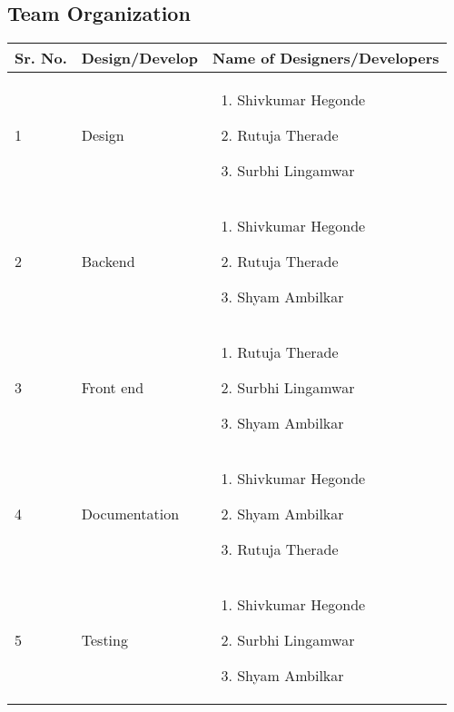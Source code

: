 \documentclass[10pt,a4paper]
{article}
\numberwithin{table}{section}
\begin{document}
{{\begin{normalsize}
\begin{center}
\begin{figure}[h]
		\end{figure}
		\end{center}



 \newpage
\subsection{Team Organization}
\begin{table}[hbtp]
\begin{center}
\begin{tabular}{|p{30pt}|p{100pt} | p{200pt} |}
\hline
{Sr. No.} & Design/Develop & Name of Designers/Developers \\
\hline
1 & Design & \begin{enumerate}
\item Shivkumar Hegonde \item Rutuja Therade
\item Surbhi Lingamwar
\end{enumerate} \\
\hline
2 & Backend & \begin{enumerate}
\item Shivkumar Hegonde \item Rutuja Therade \item  Shyam Ambilkar 
\end{enumerate}\\ \hline 
3 & Front end &\begin{enumerate}
\item Rutuja Therade \item  Surbhi Lingamwar \item Shyam Ambilkar
\end{enumerate}\\ \hline
4 & Documentation & \begin{enumerate}
\item Shivkumar Hegonde \item Shyam Ambilkar \item Rutuja Therade
\end{enumerate} \\ \hline
5 & Testing &\begin{enumerate}
\item Shivkumar Hegonde \item  Surbhi Lingamwar \item Shyam Ambilkar
\end{enumerate}\\ 
\hline
\end{tabular}
\end{center}
\end{table}




\end{normalsize}}}
\end{document}
